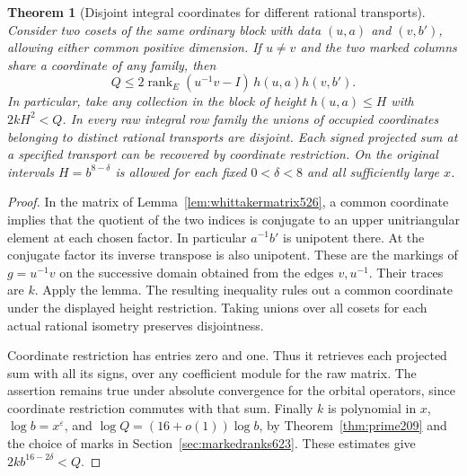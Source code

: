 \documentclass[a4paper,11pt]{article}
\newtheorem{theorem}[proposition]{Theorem}
\theoremstyle{definition}
\theoremstyle{remark}
\numberwithin{equation}{section}
\begin{document}
\begin{theorem}[Disjoint integral coordinates for different rational transports]
\leavevmode\label{thm:disjointtransports638}
Consider two cosets of the same ordinary block with data
\((u,a)\) and \((v,b')\), allowing either common positive dimension.
If \(u\ne v\) and the two marked columns share a coordinate of any
family, then
\[
        Q\le 2\operatorname{rank}_E(u^{-1}v-I)\,h(u,a)h(v,b').
\]
In particular, take any collection in the block of height
\(h(u,a)\le H\) with \(2kH^2<Q\). In every raw integral row family
the unions of occupied coordinates belonging to distinct rational
transports are disjoint. Each signed projected sum at a specified
transport can be recovered by coordinate restriction. On the
original intervals \(H=b^{8-\delta}\) is allowed for each fixed
\(0<\delta<8\) and all sufficiently large \(x\).
\end{theorem}
\begin{proof}
In the matrix of Lemma~\ref{lem:whittakermatrix526}, a common
coordinate implies that the quotient of the two indices is
conjugate to an upper unitriangular element at each chosen factor.
In particular \(a^{-1}b'\) is unipotent there. At the conjugate
factor its inverse transpose is also unipotent. These are the
markings of \(g=u^{-1}v\) on the successive domain obtained from
the edges \(v,u^{-1}\). Their traces are \(k\). Apply the lemma.
The resulting inequality rules out a common coordinate under the
displayed height restriction. Taking unions over all cosets for
each actual rational isometry preserves disjointness.

Coordinate restriction has entries zero and one. Thus it retrieves
each projected sum with all its signs, over any coefficient module
for the raw matrix. The assertion remains true under absolute
convergence for the orbital operators, since coordinate restriction
commutes with that sum. Finally \(k\) is polynomial in \(x\),
\(\log b=x^\varepsilon\), and \(\log Q=(16+o(1))\log b\), by
Theorem~\ref{thm:prime209} and the choice of marks in
Section~\ref{sec:markedranks623}. These estimates give
\(2k b^{16-2\delta}<Q\).
\end{proof}
\end{document}
